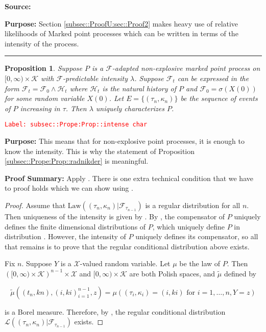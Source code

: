 \documentclass[12pt]{article}
\newcommand{\mc}{\mathcal}
\newcommand{\ms}{\mathscr}
\newcommand{\te}{\text}
\newcommand{\tr}{\textcolor{red}}
\newcommand{\labe}[1]{\tr{\texttt{Label: #1}}}
\newcommand{\purpose}{\textbf{Purpose: }}
\newcommand{\pfsum}{\textbf{Proof Summary: }}
\newcommand{\ind}{\hspace{24pt}}
\newcommand{\lin}{\rule{\linewidth}{0.4 pt}}
\renewcommand{\t}{t}							%
\newcommand{\F}{\mc{F}}							%
\newcommand{\FH}{\mc{H}}						%
\newcommand{\X}{X}								%
\newcommand{\tp}[1]{(#1)}						%
\newcommand{\ts}[1]{_{#1}}						%
\newcommand{\rate}{\lambda}						%
\newcommand{\alt}[1]{\widetilde{#1}}			%
\newcommand{\indx}[1]{_{#1}}					%
\newcommand{\m}{\mu}							%
\newcommand{\law}{\te{Law}}						%
\newcommand{\XX}{Y}								%
\newcommand{\rt}{\tau}							%
\renewcommand{\mark}{\kappa}					%
\newcommand{\rp}{P}								%
\newcommand{\spce}{\mc{X}}						%
\newcommand{\xxx}{z}							%
\newcommand{\mspce}{\mc{K}}						%
\newtheorem{prop}[thms]{Proposition}
\begin{document}
\textbf{Source: }\cite[Definition 14.3.I]{DalVer08}

\purpose Section \ref{subsec::ProofU:sec::Proof2} makes heavy use of relative likelihoods of Marked point processes which can be written in terms of the intensity of the process.

\lin

\begin{prop}
Suppose \(\rp\) is a \(\F\)-adapted non-explosive marked point process on \([0,\infty)\times \mspce\) with \(\F\)-predictable intensity \(\rate\). Suppose \(\F\ts{\t}\) can be expressed in the form \(\F\ts{\t} = \F\ts{0}\wedge \FH\ts{\t}\) where \(\FH\ts{\t}\) is the natural history of \(\rp\) and \(\F\ts{0} = \sigma(\X\tp{0})\) for some random variable \(\X\tp{0}\). Let \(E = \{(\rt\indx{n},\mark\indx{n})\}\) be the sequence of events of \(\rp\) increasing in \(\rt\). Then \(\rate\) uniquely characterizes \(\rp\).
\label{subsec::Prope:Prop::intense char}
\end{prop}
\labe{subsec::Prope:Prop::intense char}

\purpose This means that for non-explosive point processes, it is enough to know the intensity. This is why the statement of Proposition \ref{subsec::Prope:Prop::radnikder} is meaningful.

\pfsum Apply \cite[Propositions 14.3.II(b),14.2.IV(c) and 9.2.III]{DalVer08}. There is one extra technical condition that we have to proof holds which we can show using \cite[Proposition A1.5.III]{DalVer03}.

\begin{proof}
Assume that \(\law((\rt\indx{n},\mark\indx{n})|\F\ts{\rt\indx{n-1}})\) is a regular distribution for all \(n\). Then uniqueness of the intensity is given by \cite[Proposition 14.3.II (b)]{DalVer08}. By \cite[Proposition 14.2.IV (c)]{DalVer08}, the compensator of \(\rp\) uniquely defines the finite dimensional distributions of \(\rp\), which uniquely define \(\rp\) in distribution \cite[Proposition 9.2.III]{DalVer08}. However, the intensity of \(\rp\) uniquely defines its compensator, so all that remains is to prove that the regular conditional distribution above exists.

\ind Fix \(n\). Suppose \(\XX\) is a \(\spce\)-valued random variable. Let \(\m\) be the law of \(\rp\). Then \(\left([0,\infty)\times \mspce\right)^{n-1}\times\spce\) and \([0,\infty)\times \mspce\) are both Polish spaces, and \(\alt{\m}\) defined by 

\[\alt{\m}((\t\indx{n},k{n}),(	{i},k{i})_{i=1}^{n-1},\xxx) = \m\left((\rt\indx{i},\mark\indx{i}) = (	{i},k{i})\te{ for } i=1,\dots,n, \XX = \xxx\right)\]

is a Borel measure. Therefore, by \cite[Proposition A1.5.III]{DalVer03}, the regular conditional distribution \(\ms{L}((\rt\indx{n},\mark\indx{n})|\F\ts{\rt\indx{n-1}})\) exists.
\end{proof}
\end{document}
